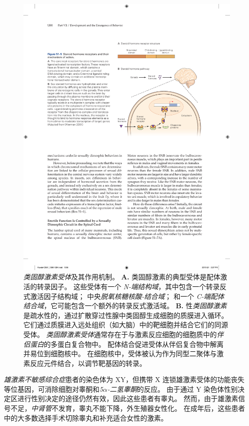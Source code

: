 \begin{figure}[htbp]
	\centering
	\includegraphics[width=1.0\linewidth]{chap51/fig_51_5}
	\caption{\textit{类固醇激素受体}及其作用机制。
		\textbf{A.} 类固醇激素的典型受体是配体激活的转录因子。
		这些受体有一个 \textit{N-端结构域}，其中包含一个转录反式激活因子结构域；
		中央\textit{脱氧核糖核酸-结合域}；
		和一个 \textit{C-端配体结合域}，它可能包含一个额外的转录反式激活域。
		\textbf{B.} 性\textit{类固醇激素}是疏水性的，通过扩散穿过性腺中类固醇生成细胞的质膜进入循环。
		它们通过质膜进入远处组织（如大脑）中的靶细胞并结合它们的同源受体。
		\textit{类固醇激素受体}通常存在于与激素反应细胞的细胞质中的\textit{伴侣蛋白}的多蛋白复合物中。
		配体结合促进受体从伴侣复合物中解离并易位到细胞核中。
		在细胞核中，受体被认为作为同型二聚体与激素反应元件结合，以调节靶基因的转录\cite{wierman2007sex}。}
	\label{fig:51_5}
\end{figure}


\textit{雄激素不敏感综合症}患者的染色体为 XY，但携带 X 连锁雄激素受体的功能丧失等位基因，可消除细胞对睾酮和\textit{5$\alpha$-二氢睾酮}的反应。
由于通过 Y 染色体性别决定区进行性别决定的途径仍然有效，因此这些患者有睾丸。
然而，由于雄激素信号不足，\textit{中肾管}不发育，睾丸不能下降，外生殖器女性化。
在成年后，这些患者中的大多数选择手术切除睾丸和补充适合女性的激素。



